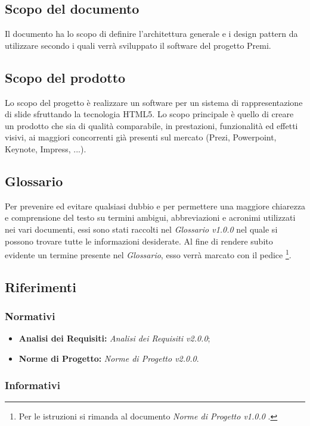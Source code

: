 \subsection{Scopo del documento}
	Il documento ha lo scopo di definire l'architettura generale e i design pattern da utilizzare secondo i quali verrà sviluppato il software del progetto Premi.
	
\subsection{Scopo del prodotto}
Lo scopo del progetto è realizzare un software per un sistema di rappresentazione di slide sfruttando la tecnologia  HTML5. Lo scopo principale è quello di creare un prodotto che sia di qualità comparabile, in prestazioni, funzionalità ed effetti visivi, ai maggiori concorrenti già presenti sul mercato (Prezi, Powerpoint, Keynote, Impress, ...).

\subsection{Glossario}
Per prevenire ed evitare qualsiasi dubbio e per permettere una maggiore chiarezza e comprensione del testo su termini ambigui, abbreviazioni e acronimi utilizzati nei vari documenti, essi sono stati raccolti nel \textit{Glossario v1.0.0} nel quale si possono trovare tutte le informazioni desiderate.
Al fine di rendere subito evidente un termine presente nel \textit{Glossario}, esso verrà marcato con il pedice \G\footnote{Per le istruzioni si rimanda al documento \textit{Norme di Progetto v1.0.0} .}.

\subsection{Riferimenti}

\subsubsection{Normativi}
	\begin{itemize}
		\item \textbf{Analisi dei Requisiti:} \textit{Analisi dei Requisiti v2.0.0};
		\item \textbf{Norme di Progetto:} \textit{Norme di Progetto v2.0.0}.
	\end{itemize}
	
\subsubsection{Informativi}